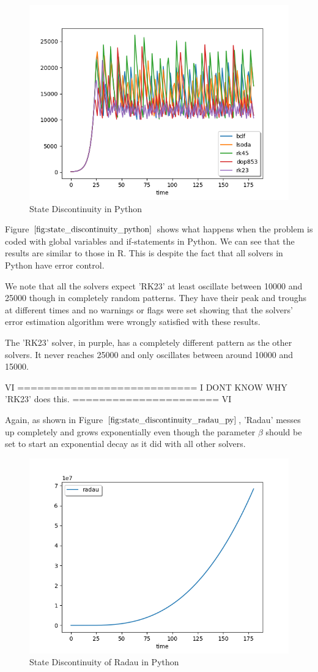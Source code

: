 \begin{figure}[h]
	\centering
	\includegraphics[width=0.7\linewidth]{./figures/state_discontinuity_py}
	\caption{State Discontinuity in Python}
	\label{fig:state_discontinuity_python}
\end{figure}
Figure $\ref{fig:state_discontinuity_python}$ shows what happens when the problem is coded with global variables and if-statements in Python. We can see that the results are similar to those in R. This is despite the fact that all solvers in Python have error control.

We note that all the solvers expect 'RK23' at least oscillate between 10000 and 25000 though in completely random patterns. They have their peak and troughs at different times and no warnings or flags were set showing that the solvers' error estimation algorithm were wrongly satisfied with these results.

The 'RK23' solver, in purple, has a completely different pattern as the other solvers.  It never reaches 25000 and only oscillates between around 10000 and 15000. 

VI ===========================
I DONT KNOW WHY 'RK23' does this.
====================== VI

Again, as shown in Figure $\ref{fig:state_discontinuity_radau_py}$, 'Radau' messes up completely and grows exponentially even though the parameter $\beta$ should be set to start an exponential decay as it did with all other solvers.

\begin{figure}[h]
	\centering
	\includegraphics[width=0.7\linewidth]{./figures/state_discontinuity_radau_py}
	\caption{State Discontinuity of Radau in Python}
	\label{fig:state_discontinuity_radau_py}
\end{figure}

